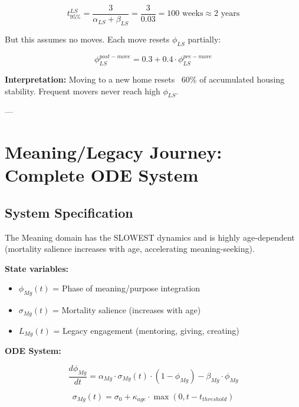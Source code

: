 \begin{equation}
t_{95\%}^{LS} = \frac{3}{\alpha_{LS} + \beta_{LS}} = \frac{3}{0.03} = 100 \text{ weeks} \approx 2 \text{ years}
\end{equation}

But this assumes no moves. Each move resets $\phi_{LS}$ partially:

\begin{equation}
\phi_{LS}^{post-move} = 0.3 + 0.4 \cdot \phi_{LS}^{pre-move}
\end{equation}

\textbf{Interpretation:} Moving to a new home resets ~60\% of accumulated housing stability.
Frequent movers never reach high $\phi_{LS}$.

---


\section{Meaning/Legacy Journey: Complete ODE System}
\label{ooo:meaning}

\subsection{System Specification}

The Meaning domain has the SLOWEST dynamics and is highly age-dependent
(mortality salience increases with age, accelerating meaning-seeking).

\textbf{State variables:}
\begin{itemize}[nosep]
\item $\phi_{Mg}(t)$ = Phase of meaning/purpose integration
\item $\sigma_{Mg}(t)$ = Mortality salience (increases with age)
\item $L_{Mg}(t)$ = Legacy engagement (mentoring, giving, creating)
\end{itemize}

\textbf{ODE System:}

\begin{equation}
\frac{d\phi_{Mg}}{dt} = \alpha_{Mg} \cdot \sigma_{Mg}(t) \cdot (1 - \phi_{Mg}) - \beta_{Mg} \cdot \phi_{Mg}
\label{eq:mg-phase}
\end{equation}

\begin{equation}
\sigma_{Mg}(t) = \sigma_0 + \kappa_{age} \cdot \max(0, t - t_{threshold})
\label{eq:mg-salience}
\end{equation}

